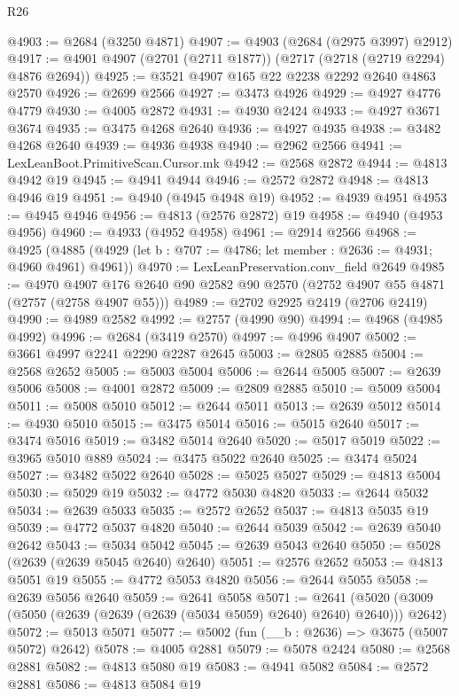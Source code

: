 \begin{lexlean}{R26}
\begin{coremodule}
@4903 := @2684 (@3250 @4871)
@4907 := @4903 (@2684 (@2975 @3997) @2912)
@4917 := @4901 @4907 (@2701 (@2711 @1877)) (@2717 (@2718 (@2719 @2294) @4876 @2694))
@4925 := @3521 @4907 @165 @22 @2238 @2292 @2640 @4863 @2570
@4926 := @2699 @2566
@4927 := @3473 @4926
@4929 := @4927 @4776 @4779
@4930 := @4005 @2872
@4931 := @4930 @2424
@4933 := @4927 @3671 @3674
@4935 := @3475 @4268 @2640
@4936 := @4927 @4935
@4938 := @3482 @4268 @2640
@4939 := @4936 @4938
@4940 := @2962 @2566
@4941 := LexLeanBoot.PrimitiveScan.Cursor.mk
@4942 := @2568 @2872
@4944 := @4813 @4942 @19
@4945 := @4941 @4944
@4946 := @2572 @2872
@4948 := @4813 @4946 @19
@4951 := @4940 (@4945 @4948 @19)
@4952 := @4939 @4951
@4953 := @4945 @4946
@4956 := @4813 (@2576 @2872) @19
@4958 := @4940 (@4953 @4956)
@4960 := @4933 (@4952 @4958)
@4961 := @2914 @2566
@4968 := @4925
    (@4885 (@4929 (let b : @707 := @4786; let member : @2636 := @4931; @4960 @4961) @4961))
@4970 := LexLeanPreservation.conv_field @2649
@4985 := @4970
    @4907
    @176
    @2640
    @90
    @2582
    @90
    @2570
    (@2752 @4907 @55 @4871 (@2757 (@2758 @4907 @55)))
@4989 := @2702 @2925 @2419 (@2706 @2419)
@4990 := @4989 @2582
@4992 := @2757 (@4990 @90)
@4994 := @4968 (@4985 @4992)
@4996 := @2684 (@3419 @2570)
@4997 := @4996 @4907
@5002 := @3661 @4997 @2241 @2290 @2287 @2645
@5003 := @2805 @2885
@5004 := @2568 @2652
@5005 := @5003 @5004
@5006 := @2644 @5005
@5007 := @2639 @5006
@5008 := @4001 @2872
@5009 := @2809 @2885
@5010 := @5009 @5004
@5011 := @5008 @5010
@5012 := @2644 @5011
@5013 := @2639 @5012
@5014 := @4930 @5010
@5015 := @3475 @5014
@5016 := @5015 @2640
@5017 := @3474 @5016
@5019 := @3482 @5014 @2640
@5020 := @5017 @5019
@5022 := @3965 @5010 @889
@5024 := @3475 @5022 @2640
@5025 := @3474 @5024
@5027 := @3482 @5022 @2640
@5028 := @5025 @5027
@5029 := @4813 @5004
@5030 := @5029 @19
@5032 := @4772 @5030 @4820
@5033 := @2644 @5032
@5034 := @2639 @5033
@5035 := @2572 @2652
@5037 := @4813 @5035 @19
@5039 := @4772 @5037 @4820
@5040 := @2644 @5039
@5042 := @2639 @5040 @2642
@5043 := @5034 @5042
@5045 := @2639 @5043 @2640
@5050 := @5028 (@2639 (@2639 @5045 @2640) @2640)
@5051 := @2576 @2652
@5053 := @4813 @5051 @19
@5055 := @4772 @5053 @4820
@5056 := @2644 @5055
@5058 := @2639 @5056 @2640
@5059 := @2641 @5058
@5071 := @2641 (@5020 (@3009 (@5050 (@2639 (@2639 (@2639 (@5034 @5059) @2640) @2640) @2640))) @2642)
@5072 := @5013 @5071
@5077 := @5002 (fun (__b : @2636) => @3675 (@5007 @5072) @2642)
@5078 := @4005 @2881
@5079 := @5078 @2424
@5080 := @2568 @2881
@5082 := @4813 @5080 @19
@5083 := @4941 @5082
@5084 := @2572 @2881
@5086 := @4813 @5084 @19

\end{coremodule}
\end{lexlean}
